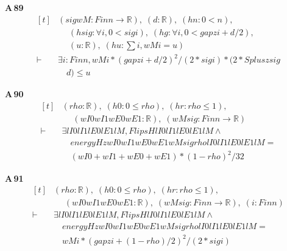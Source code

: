 \noindent\textbf{A\,89}\quad{}
{\footnotesize\[ \begin{aligned}[t]
&(\mathit{sig} \mathit{wM} : \mathit{Fin} \mathit{n} \to \mathbb{R} ),\; (\mathit{d} : \mathbb{R} ),\; (\mathit{hn} : 0 < \mathit{n}),\\
&\quad \; (\mathit{hsig} : \forall \mathit{i}, 0 < \mathit{sig} \mathit{i}),\; (\mathit{hg} : \forall \mathit{i}, 0 < \mathit{gap} \mathit{z} \mathit{i} + \mathit{d}/2),\\
&\quad \; (\mathit{u} : \mathbb{R} ),\; (\mathit{hu} : \textstyle\sum \mathit{i}, \mathit{wM} \mathit{i} = \mathit{u})\\
\vdash\;&\exists \mathit{i} : \mathit{Fin} \mathit{n}, \mathit{wM} \mathit{i}*(\mathit{gap} \mathit{z} \mathit{i} + \mathit{d}/2)^{2}/(2*\mathit{sig} \mathit{i})*(2*\mathit{Splus} \mathit{z} \mathit{sig}\\
&\quad \mathit{d}) \leq \mathit{u}
\end{aligned} \]}

\noindent\textbf{A\,90}\quad{}
{\footnotesize\[ \begin{aligned}[t]
&(\mathit{rho} : \mathbb{R} ),\; (\mathit{h0} : 0 \leq \mathit{rho}),\; (\mathit{hr} : \mathit{rho} \leq 1),\\
&\quad \; (\mathit{wI0} \mathit{wI1} \mathit{wE0} \mathit{wE1} : \mathbb{R} ),\; (\mathit{wM} \mathit{sig} : \mathit{Fin} \mathit{n} \to \mathbb{R} )\\
\vdash\;&\exists \mathit{lI0} \mathit{lI1} \mathit{lE0} \mathit{lE1} \mathit{lM}, \mathit{FlipsH} \mathit{lI0} \mathit{lI1} \mathit{lE0} \mathit{lE1} \mathit{lM} \wedge\\
&\quad \mathit{energyH} \mathit{z} \mathit{wI0} \mathit{wI1} \mathit{wE0} \mathit{wE1} \mathit{wM} \mathit{sig} \mathit{rho} \mathit{lI0} \mathit{lI1} \mathit{lE0} \mathit{lE1} \mathit{lM} =\\
&\quad (\mathit{wI0} + \mathit{wI1} + \mathit{wE0} + \mathit{wE1})*(1-\mathit{rho})^{2}/32
\end{aligned} \]}

\noindent\textbf{A\,91}\quad{}
{\footnotesize\[ \begin{aligned}[t]
&(\mathit{rho} : \mathbb{R} ),\; (\mathit{h0} : 0 \leq \mathit{rho}),\; (\mathit{hr} : \mathit{rho} \leq 1),\\
&\quad \; (\mathit{wI0} \mathit{wI1} \mathit{wE0} \mathit{wE1} : \mathbb{R} ),\; (\mathit{wM} \mathit{sig} : \mathit{Fin} \mathit{n} \to \mathbb{R} ),\; (\mathit{i} : \mathit{Fin} \mathit{n})\\
\vdash\;&\exists \mathit{lI0} \mathit{lI1} \mathit{lE0} \mathit{lE1} \mathit{lM}, \mathit{FlipsH} \mathit{lI0} \mathit{lI1} \mathit{lE0} \mathit{lE1} \mathit{lM} \wedge\\
&\quad \mathit{energyH} \mathit{z} \mathit{wI0} \mathit{wI1} \mathit{wE0} \mathit{wE1} \mathit{wM} \mathit{sig} \mathit{rho} \mathit{lI0} \mathit{lI1} \mathit{lE0} \mathit{lE1} \mathit{lM} =\\
&\quad \mathit{wM} \mathit{i}*(\mathit{gap} \mathit{z} \mathit{i} + (1-\mathit{rho})/2)^{2}/(2*\mathit{sig} \mathit{i})
\end{aligned} \]}

